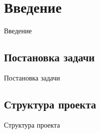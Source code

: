 \section{Введение}
Введение

\subsection{Постановка задачи}
Постановка задачи

\subsection{Структура проекта}
Структура проекта

\newpage
